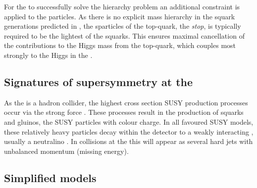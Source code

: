 For the \MSSM to successfully solve the hierarchy problem an
additional constraint is applied to the \SUSY particles. As there is
no explicit mass hierarchy in the squark generations predicted in
\SUSY, the sparticles of the top-quark, the \emph{stop}, is typically
required to be the lightest of the squarks. This ensures maximal
cancellation of the contributions to the Higgs mass from the
top-quark, which couples most strongly to the Higgs in the \SM.

\subsection{Signatures of supersymmetry at the \LHC}


As the \LHC is a hadron collider, the highest cross section SUSY
production processes occur via the strong force
\cite{Martin:1997ns}
\cite{SUSYxsections_NewAspectsof_pp_collisions}. These processes
result in the production of squarks and gluinos, the SUSY particles
with colour charge. In all favoured SUSY models, these relatively
heavy particles decay within the detector to a weakly interacting \LSP,
usually a neutralino \cite{Farrar:1978xj}. In
collisions at the \LHC this will appear as several hard jets with
unbalanced momentum (missing energy). 

\subsection{Simplified models}

